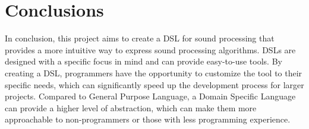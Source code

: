 \chapter*{Conclusions}
\par In conclusion, this project aims to create a DSL for sound processing that provides a more intuitive way to express sound processing algorithms. DSLs are designed with a specific focus in mind and can provide easy-to-use tools. By creating a DSL, programmers have the opportunity to customize the tool to their specific needs, which can significantly speed up the development process for larger projects. Compared to General Purpose Language, a Domain Specific Language can provide a higher level of abstraction, which can make them more approachable to non-programmers or those with less programming experience.